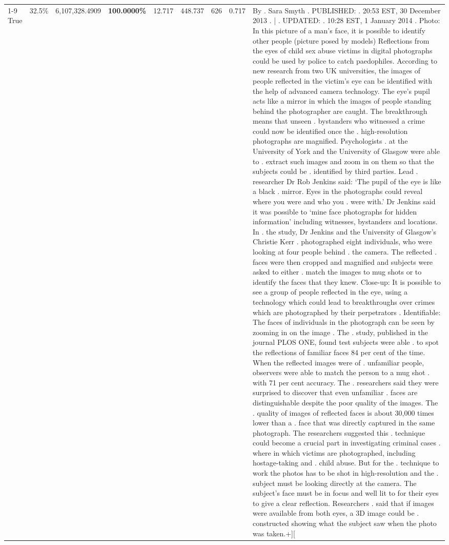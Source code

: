 \begin{table}[H]
\begin{tabular}{lllrlllll}
\cline{1-9}
True & 32.5\% & 6,107,328.4909 & \bfseries \color{red} 100.0000\% & 12.717 & 448.737 & 626 & 0.717 & By . Sara Smyth . PUBLISHED: . 20:53 EST, 30 December 2013 . | . UPDATED: . 10:28 EST, 1 January 2014 . Photo: In this picture of a man's face, it is possible to identify other people (picture posed by models) Reflections from the eyes of child sex abuse victims in digital photographs could be used by police to catch paedophiles. According to new research from two UK universities, the images of people reflected in the victim's eye can be identified with the help of advanced camera technology. The eye's pupil acts like a mirror in which the images of people standing behind the photographer are caught. The breakthrough means that unseen . bystanders who witnessed a crime could now be identified once the . high-resolution photographs are magnified. Psychologists . at the University of York and the University of Glasgow were able to . extract such images and zoom in on them so that the subjects could be . identified by third parties. Lead . researcher Dr Rob Jenkins said: ‘The pupil of the eye is like a black . mirror. Eyes in the photographs could reveal where you were and who you . were with.' Dr Jenkins said it was possible to ‘mine face photographs for hidden information' including witnesses, bystanders and locations. In . the study, Dr Jenkins and the University of Glasgow's Christie Kerr . photographed eight individuals, who were looking at four people behind . the camera. The reflected . faces were then cropped and magnified and subjects were asked to either . match the images to mug shots or to identify the faces that they knew. Close-up: It is possible to see a group of people reflected in the eye, using a technology which could lead to breakthroughs over crimes which are photographed by their perpetrators . Identifiable: The faces of individuals in the photograph can be seen by zooming in on the image . The . study, published in the journal PLOS ONE, found test subjects were able . to spot the reflections of familiar faces 84 per cent of the time. When the reflected images were of . unfamiliar people, observers were able to match the person to a mug shot . with 71 per cent accuracy. The . researchers said they were surprised to discover that even unfamiliar . faces are distinguishable despite the poor quality of the images. The . quality of images of reflected faces is about 30,000 times lower than a . face that was directly captured in the same photograph. The researchers suggested this . technique could become a crucial part in investigating criminal cases . where in which victims are photographed, including hostage-taking and . child abuse. But for the . technique to work the photos has to be shot in high-resolution and the . subject must be looking directly at the camera. The subject's face must be in focus and well lit to for their eyes to give a clear reflection. Researchers . said that if images were available from both eyes, a 3D image could be . constructed showing what the subject saw when the photo was taken.+][ \\

\end{tabular}
\end{table}
